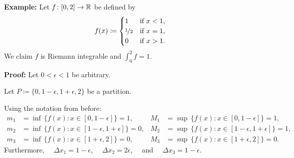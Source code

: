 \documentclass[10pt,aspectratio=169]{beamer}
\begin{document}
\begin{frame}

\textbf{Example:}
Let $f \colon [0,2] \to {\mathbb{R}}$ be defined by
\begin{equation*}
f(x) \coloneqq
\begin{cases}
1               & \text{if } x < 1,\\
\nicefrac{1}{2} & \text{if } x = 1,\\
0               & \text{if } x > 1.
\end{cases}
\end{equation*}
\pause
We claim $f$ is Riemann integrable and $\displaystyle \int_0^2 f = 1$.

\pause
\medskip

\textbf{Proof:}
Let $0 < \epsilon < 1$ be arbitrary.

\pause
Let $P \coloneqq \{0, 1-\epsilon, 1+\epsilon, 2\}$ be a partition.

\pause
Using the notation from before:
\begin{align*}
m_1 &= \inf \, \bigl\{ f(x) : x \in [0,1-\epsilon] \bigr\} = 1 , & 
M_1 &= \sup \, \bigl\{ f(x) : x \in [0,1-\epsilon] \bigr\} = 1 , \\
m_2 &= \inf \, \bigl\{ f(x) : x \in [1-\epsilon,1+\epsilon] \bigr\} = 0 , & 
M_2 &= \sup \, \bigl\{ f(x) : x \in [1-\epsilon,1+\epsilon] \bigr\} = 1 , \\
m_3 &= \inf \, \bigl\{ f(x) : x \in [1+\epsilon,2] \bigr\} = 0 , & 
M_3 &= \sup \, \bigl\{ f(x) : x \in [1+\epsilon,2] \bigr\} = 0 .
\end{align*}
\pause
Furthermore, ~~$\Delta x_1 = 1-\epsilon$,
~~$\Delta x_2 = 2\epsilon$,~~ and ~~$\Delta x_3 = 1-\epsilon$.

\end{frame}
\end{document}
